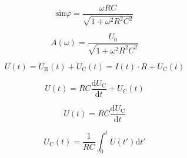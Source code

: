         \begin{equation}
            \text{sin} \varphi = \frac{\omega R C}{ \sqrt{1 + \omega^2 R^2 C^2} }
        \end{equation}

        \begin{equation}
            A(\omega) = \frac{U_0}{\sqrt{1 + \omega^2 R^2 C^2}}
        \end{equation}

        \begin{equation}
            U(t) = U_{\text{R}}(t) + U_{\text{C}}(t) = I(t) \cdot R + U_{\text{C}}(t)
        \end{equation}

        \begin{equation}
            U(t) = RC \frac{\text{d}U_{\text{C}}}{\text{d}t} + U_{\text{C}}(t)
        \end{equation}

        \begin{equation}
            U(t) = RC \frac{\text{d}U_{\text{C}}}{\text{d}t}
        \end{equation}

        \begin{equation}
            U_{\text{C}}(t) = \frac{1}{RC} \int_0^t U(t')\text{d}t'
        \end{equation}